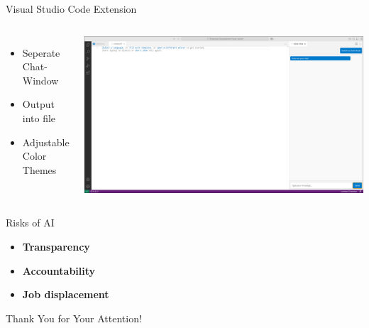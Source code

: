 \documentclass{beamer}
\begin{document}
\begin{frame}{Visual Studio Code Extension}
  \begin{columns}
      \begin{itemize}
        \item Seperate Chat-Window
        \item Output into file
        \item Adjustable Color Themes
      \end{itemize}
      \centering
      \includegraphics[width=\textwidth]{VSCodeExtension.png}
  \end{columns}
\end{frame}

\begin{frame}{Risks of AI}

  \begin{itemize}
    \item \textbf{Transparency}
    \item \textbf{Accountability}
    \item \textbf{Job displacement}
  \end{itemize}


\end{frame}

\begin{frame}[plain]
  
  \centering
  \vspace{1cm}
  \Huge Thank You for Your Attention!
\end{frame}
\end{document}
